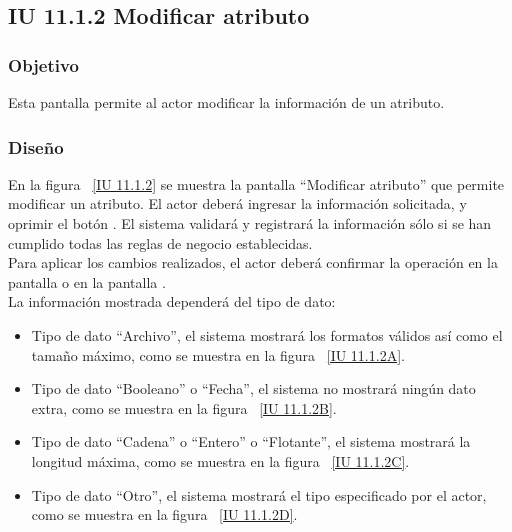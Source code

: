 \newpage 
\subsection{IU 11.1.2 Modificar atributo}

\subsubsection{Objetivo}
	
	Esta pantalla permite al actor modificar la información de un atributo.

\subsubsection{Diseño}

    En la figura ~\ref{IU 11.1.2} se muestra la pantalla ``Modificar atributo'' que permite modificar un atributo. El actor deberá ingresar la información solicitada,
    y oprimir el botón . El sistema validará y registrará la información sólo si se han cumplido todas las reglas de negocio establecidas.  \\
    
    Para aplicar los cambios realizados, el actor deberá confirmar la operación en la pantalla  o en la pantalla . \\
	
	La información mostrada dependerá del tipo de dato:
	\begin{itemize}
		\item Tipo de dato ``Archivo'', el sistema mostrará los formatos válidos así como el tamaño máximo, como se muestra en la figura ~\ref{IU 11.1.2A}.
		\item Tipo de dato ``Booleano'' o ``Fecha'', el sistema no mostrará ningún dato extra, como se muestra en la figura ~\ref{IU 11.1.2B}.
		\item Tipo de dato ``Cadena'' o ``Entero'' o ``Flotante'', el sistema mostrará la longitud máxima, como se muestra en la figura ~\ref{IU 11.1.2C}.
		\item Tipo de dato ``Otro'', el sistema mostrará el tipo especificado por el actor, como se muestra en la figura ~\ref{IU 11.1.2D}.
	\end{itemize}
	
	

